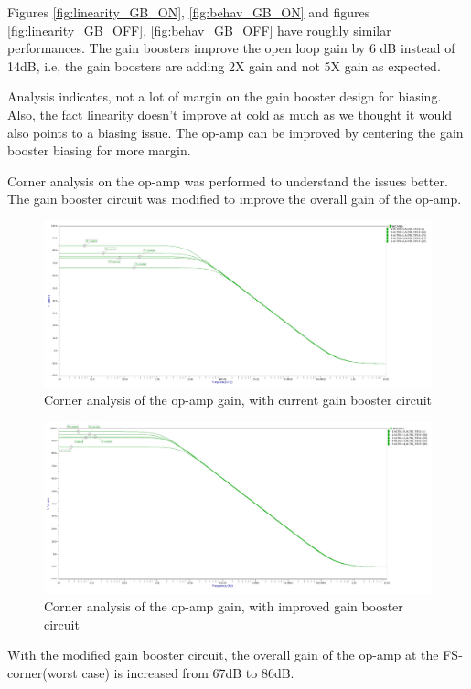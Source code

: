 Figures \ref{fig:linearity_GB_ON}, \ref{fig:behav_GB_ON} and figures \ref{fig:linearity_GB_OFF}, \ref{fig:behav_GB_OFF} have roughly similar performances. The gain boosters improve the open loop gain by 6 dB instead of 14dB, i.e, the gain boosters are adding 2X gain and not 5X gain as expected. 

Analysis indicates, not a lot of margin on the gain booster design for biasing. Also, the fact linearity doesn't improve at cold as much as we thought it would also points to a biasing issue. The op-amp can be improved by centering the gain booster biasing for more margin. 

Corner analysis on the op-amp was performed to understand the issues better. The gain booster circuit was modified to improve the overall gain of the op-amp. 

\begin{figure}[h!]
\centering
  \includegraphics[width=0.8\linewidth]{figures/prakash_fig/opamp_gain_rt.JPG}
  \caption{Corner analysis of the op-amp gain, with current gain booster circuit}
  \label{fig:opamp_gain_rt}
\end{figure}

\begin{figure}[h!]
\centering
  \includegraphics[width=0.8\linewidth]{figures/prakash_fig/opamp_gain_m_rt.JPG}
  \caption{Corner analysis of the op-amp gain, with improved gain booster circuit}
  \label{fig:opamp_gain_m_rt}
\end{figure}

With the modified gain booster circuit, the overall gain of the op-amp at the FS-corner(worst case) is increased from 67dB to 86dB. 
